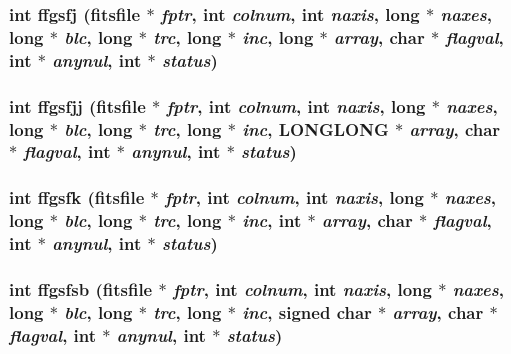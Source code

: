 \subsubsection{\setlength{\rightskip}{0pt plus 5cm}int ffgsfj (\bf{fitsfile} $\ast$ {\em fptr}, int {\em colnum}, int {\em naxis}, long $\ast$ {\em naxes}, long $\ast$ {\em blc}, long $\ast$ {\em trc}, long $\ast$ {\em inc}, long $\ast$ {\em array}, char $\ast$ {\em flagval}, int $\ast$ {\em anynul}, int $\ast$ {\em status})}\label{src_2fitsio_8h_5fe7f8cf0ec4c375a0d8883974df5e3f}


\subsubsection{\setlength{\rightskip}{0pt plus 5cm}int ffgsfjj (\bf{fitsfile} $\ast$ {\em fptr}, int {\em colnum}, int {\em naxis}, long $\ast$ {\em naxes}, long $\ast$ {\em blc}, long $\ast$ {\em trc}, long $\ast$ {\em inc}, \bf{LONGLONG} $\ast$ {\em array}, char $\ast$ {\em flagval}, int $\ast$ {\em anynul}, int $\ast$ {\em status})}\label{src_2fitsio_8h_928fae8967c2f8fbbd25314487385b55}


\subsubsection{\setlength{\rightskip}{0pt plus 5cm}int ffgsfk (\bf{fitsfile} $\ast$ {\em fptr}, int {\em colnum}, int {\em naxis}, long $\ast$ {\em naxes}, long $\ast$ {\em blc}, long $\ast$ {\em trc}, long $\ast$ {\em inc}, int $\ast$ {\em array}, char $\ast$ {\em flagval}, int $\ast$ {\em anynul}, int $\ast$ {\em status})}\label{src_2fitsio_8h_0efb49c901a562ffccd69c4c87c47387}


\subsubsection{\setlength{\rightskip}{0pt plus 5cm}int ffgsfsb (\bf{fitsfile} $\ast$ {\em fptr}, int {\em colnum}, int {\em naxis}, long $\ast$ {\em naxes}, long $\ast$ {\em blc}, long $\ast$ {\em trc}, long $\ast$ {\em inc}, signed char $\ast$ {\em array}, char $\ast$ {\em flagval}, int $\ast$ {\em anynul}, int $\ast$ {\em status})}\label{src_2fitsio_8h_e824866f99503c243fed85e3cce3aaf4}


